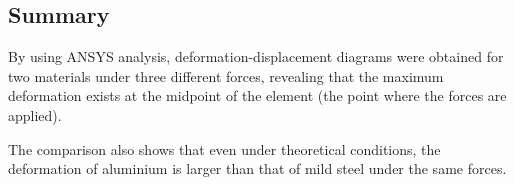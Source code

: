 \subsection*{Summary}
By using ANSYS analysis, deformation-displacement diagrams were obtained 
for two materials under three different forces, revealing that the maximum 
deformation exists at the midpoint of the element (the point where the forces are applied).

The comparison also shows that even under theoretical conditions, the deformation of aluminium is larger than that of mild steel under the same forces.
\fi